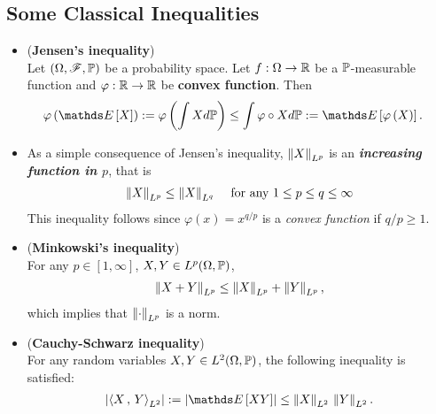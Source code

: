 \documentclass[11pt]{article}
\begin{document}
\subsection{Some Classical Inequalities}
\begin{itemize}
\item \begin{proposition} (\textbf{Jensen's inequality}) \citep{vershynin2018high}\\
Let $(\Omega, {\mathscr F}, {\mathbb P})$ be a probability space. Let $f:\Omega \to {\mathbb R}$ be a ${\mathbb P}$-measurable function and  $\varphi: {\mathbb R} \to {\mathbb R}$ be \textbf{convex function}. Then
\begin{align}
\varphi\paren{\E{}{X}} := \varphi\paren{\int X d\bP} &\le \int \varphi \circ X d\bP := \E{}{\varphi\paren{X}}. \label{ineqn: jensen}
\end{align}
\end{proposition}

\item \begin{remark}
As a simple consequence of Jensen's inequality, $\left\|X\right\|_{L^p}$ is an \emph{\textbf{increasing function in $p$}}, that is
\begin{align}
\left\|X\right\|_{L^p} \le \left\|X\right\|_{L^q}\,\quad \text{for any } 1 \le p \le q \le \infty  \label{ineqn: lp_norm}
\end{align}
This inequality follows since $\varphi(x) = x^{q/p}$ is a \emph{convex function} if $q/p \ge 1$.
\end{remark}

\item \begin{proposition} (\textbf{Minkowski's inequality}) \citep{vershynin2018high}\\
For any $p\in [1, \infty]$, $X, Y \in L^p(\Omega, {\mathbb P})$, 
\begin{align}
\left\|X+ Y\right\|_{L^p} \le \left\|X\right\|_{L^p} + \left\|Y\right\|_{L^p},  \label{ineqn: norm_triangle_inequality}
\end{align} which implies that $\left\|\cdot\right\|_{L^p}$ is a norm.
\end{proposition}

\item \begin{proposition} (\textbf{Cauchy-Schwarz inequality}) \citep{vershynin2018high}\\
For any random variables $X, Y \in L^2(\Omega, {\mathbb P})$, the following inequality is satisfied:
\begin{align}
\abs{\inn{X}{Y}_{L^2}} := \abs{\E{}{XY}} \le \norm{X}{L^2} \, \norm{Y}{L^2}. \label{ineqn: cauchy_schwarz_inequality}
\end{align}
\end{proposition}


\end{itemize}
\end{document}
